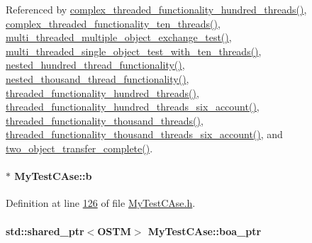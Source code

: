 Referenced by \hyperlink{_my_test_c_ase_8cpp_source_l00412}{complex\+\_\+threaded\+\_\+functionality\+\_\+hundred\+\_\+threads()}, \hyperlink{_my_test_c_ase_8cpp_source_l00467}{complex\+\_\+threaded\+\_\+functionality\+\_\+ten\+\_\+threads()}, \hyperlink{_my_test_c_ase_8cpp_source_l00922}{multi\+\_\+threaded\+\_\+multiple\+\_\+object\+\_\+exchange\+\_\+test()}, \hyperlink{_my_test_c_ase_8cpp_source_l00954}{multi\+\_\+threaded\+\_\+single\+\_\+object\+\_\+test\+\_\+with\+\_\+ten\+\_\+threads()}, \hyperlink{_my_test_c_ase_8cpp_source_l00680}{nested\+\_\+hundred\+\_\+thread\+\_\+functionality()}, \hyperlink{_my_test_c_ase_8cpp_source_l00715}{nested\+\_\+thousand\+\_\+thread\+\_\+functionality()}, \hyperlink{_my_test_c_ase_8cpp_source_l00523}{threaded\+\_\+functionality\+\_\+hundred\+\_\+threads()}, \hyperlink{_my_test_c_ase_8cpp_source_l00589}{threaded\+\_\+functionality\+\_\+hundred\+\_\+threads\+\_\+six\+\_\+account()}, \hyperlink{_my_test_c_ase_8cpp_source_l00556}{threaded\+\_\+functionality\+\_\+thousand\+\_\+threads()}, \hyperlink{_my_test_c_ase_8cpp_source_l00634}{threaded\+\_\+functionality\+\_\+thousand\+\_\+threads\+\_\+six\+\_\+account()}, and \hyperlink{_my_test_c_ase_8cpp_source_l00748}{two\+\_\+object\+\_\+transfer\+\_\+complete()}.

\paragraph[{\texorpdfstring{b}{b}}]{ $\ast$ My\+Test\+C\+Ase\+::b\hspace{0.3cm}{\ttfamily [private]}}\hypertarget{class_my_test_c_ase_a2bc5d9aab740678cb8a81ee945ed5dfb_a2bc5d9aab740678cb8a81ee945ed5dfb}{}\label{class_my_test_c_ase_a2bc5d9aab740678cb8a81ee945ed5dfb_a2bc5d9aab740678cb8a81ee945ed5dfb}


Definition at line \hyperlink{_my_test_c_ase_8h_source_l00126}{126} of file \hyperlink{_my_test_c_ase_8h_source}{My\+Test\+C\+Ase.\+h}.

\paragraph[{\texorpdfstring{boa\+\_\+ptr}{boa_ptr}}]{\setlength{\rightskip}{0pt plus 5cm}std\+::shared\+\_\+ptr$<${\bf O\+S\+TM}$>$ My\+Test\+C\+Ase\+::boa\+\_\+ptr}\hypertarget{class_my_test_c_ase_ae0b2db5d35e25b3139beeda0705494f0_ae0b2db5d35e25b3139beeda0705494f0}{}\label{class_my_test_c_ase_ae0b2db5d35e25b3139beeda0705494f0_ae0b2db5d35e25b3139beeda0705494f0}


